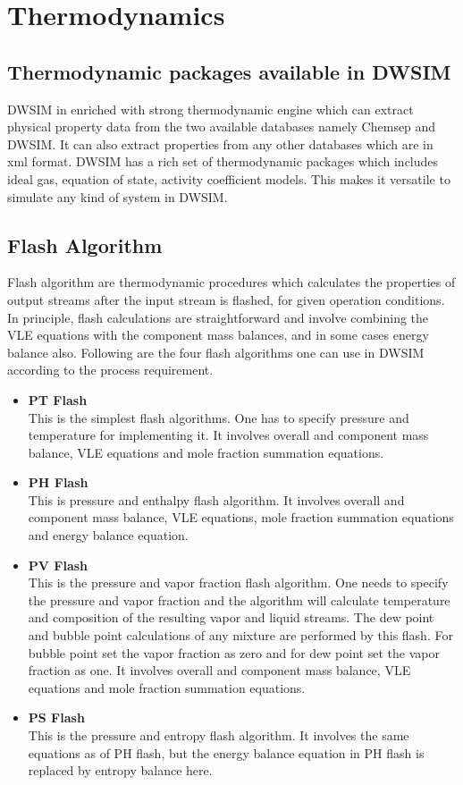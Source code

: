 \documentclass[12pt]{report}
\begin{document}
\section{Thermodynamics}
\subsection{Thermodynamic packages available in DWSIM}
DWSIM in enriched with strong thermodynamic engine which can extract physical property data from the two available databases namely Chemsep and DWSIM. It can also extract properties from any other databases which are in xml format. DWSIM has a rich set of thermodynamic packages which includes ideal gas, equation of state, activity coefficient models. This makes it versatile to simulate any kind of system in DWSIM.

\subsection{Flash Algorithm} \cite{DWSIM}
Flash algorithm are thermodynamic procedures which calculates the properties of output streams after the input stream is flashed, for given operation conditions. In principle, flash calculations are straightforward and involve combining the VLE equations with the component mass balances, and in some cases energy balance also. Following are the four flash algorithms one can use in DWSIM according to the process requirement.

\begin{itemize}
\item{\textbf{PT Flash}} \\
This is the simplest flash algorithms. One has to specify pressure and temperature for implementing it. It involves overall and component mass balance, VLE equations and mole fraction summation equations.
\item{\textbf{PH Flash}} \\
This is pressure and enthalpy flash algorithm. It involves overall and component mass balance, VLE equations, mole fraction summation equations and energy balance equation.
\item{\textbf{PV Flash}} \\
This is the pressure and vapor fraction flash algorithm. One needs to specify the pressure and vapor fraction and the algorithm will calculate temperature and composition of the resulting vapor and liquid streams. The dew point and bubble point calculations of any mixture are performed by this flash. For bubble point set the vapor fraction as zero and for dew point set the vapor fraction as one. It involves overall and component mass balance, VLE equations and mole fraction summation equations.
\item{\textbf{PS Flash}} \\
This is the pressure and entropy flash algorithm. It involves the same equations as of PH flash, but the energy balance equation in PH flash is replaced by entropy balance here.
\end{itemize}
\end{document}
